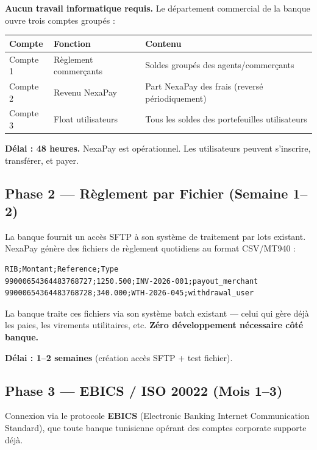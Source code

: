 \documentclass[11pt,a4paper]{article}
\begin{document}
\textbf{Aucun travail informatique requis.} Le d\'epartement commercial de la banque ouvre trois comptes group\'es :

\begin{center}
\begin{tabular}{|l|l|l|}
\hline
\textbf{Compte} & \textbf{Fonction} & \textbf{Contenu} \\
\hline
Compte 1 & R\`eglement commer\c{c}ants & Soldes group\'es des agents/commer\c{c}ants \\
Compte 2 & Revenu NexaPay & Part NexaPay des frais (revers\'e p\'eriodiquement) \\
Compte 3 & Float utilisateurs & Tous les soldes des portefeuilles utilisateurs \\
\hline
\end{tabular}
\end{center}

\textbf{D\'elai : 48 heures.} NexaPay est op\'erationnel. Les utilisateurs peuvent s'inscrire, transf\'erer, et payer.

\subsection{Phase 2 --- R\`eglement par Fichier (Semaine 1--2)}

La banque fournit un acc\`es SFTP \`a son syst\`eme de traitement par lots existant. NexaPay g\'en\`ere des fichiers de r\`eglement quotidiens au format CSV/MT940 :

\begin{verbatim}
RIB;Montant;Reference;Type
99000654364483768727;1250.500;INV-2026-001;payout_merchant
99000654364483768728;340.000;WTH-2026-045;withdrawal_user
\end{verbatim}

La banque traite ces fichiers via son syst\`eme batch existant --- celui qui g\`ere d\'ej\`a les paies, les virements utilitaires, etc. \textbf{Z\'ero d\'eveloppement n\'ecessaire c\^ot\'e banque.}

\textbf{D\'elai : 1--2 semaines} (cr\'eation acc\`es SFTP + test fichier).

\subsection{Phase 3 --- EBICS / ISO 20022 (Mois 1--3)}

Connexion via le protocole \textbf{EBICS} (Electronic Banking Internet Communication Standard), que toute banque tunisienne op\'erant des comptes corporate supporte d\'ej\`a.
\end{document}
